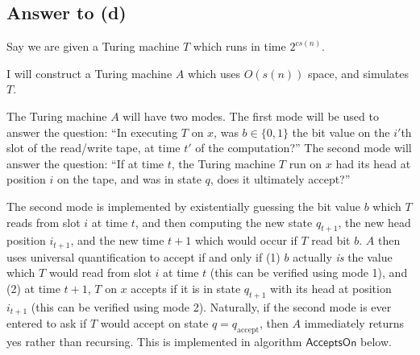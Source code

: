 \documentclass{article}
\begin{document}

\subsection*{Answer to (d)}

Say we are given a Turing machine $T$ which runs in time $2^{cs(n)}$.

I will construct a Turing machine $A$ which uses $O(s(n))$ space, and simulates $T$.

The Turing machine $A$ will have two modes.  The first mode will be used to answer the question: ``In executing $T$ on $x$, was $b \in \{0, 1\}$ the bit value on the $i'$th slot of the read/write tape, at time $t'$ of the computation?''
The second mode will answer the question: ``If at time $t$, the Turing machine $T$ run on $x$ had its head at position $i$ on the tape, and was in state $q$, does it ultimately accept?''

The second mode is implemented by existentially guessing the bit value $b$ which $T$ reads from slot $i$ at time $t$, and then computing the new state $q_{t+1}$, the new head position $i_{t+1}$, and the new time $t+1$ which would occur if $T$ read bit $b$.  $A$ then uses universal quantification to accept if and only if (1) $b$ actually \textit{is} the value which $T$ would read from slot $i$ at time $t$ (this can be verified using mode 1), and (2) at time $t + 1$, $T$ on $x$ accepts if it is in state $q_{t+1}$ with its head at position $i_{t+1}$ (this can be verified using mode 2).
Naturally, if the second mode is ever entered to ask if $T$ would accept on state $q = q_\text{accept}$, then $A$ immediately returns yes rather than recursing.  This is implemented in algorithm $\mathsf{AcceptsOn}$ below.

\end{document}
